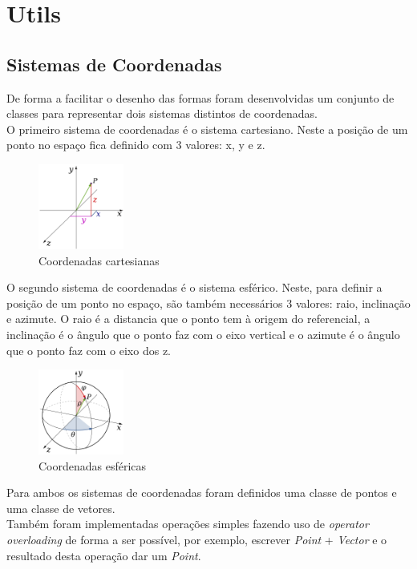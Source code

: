 \documentclass[a4paper]{report}
\begin{document}
\chapter{Utils}
\section{Sistemas de Coordenadas}
De forma a facilitar o desenho das formas foram desenvolvidas um conjunto de
classes para representar dois sistemas distintos de coordenadas.\\
O primeiro sistema de coordenadas é o sistema cartesiano. Neste a posição de um
ponto no espaço fica definido com 3 valores: x, y e z.\\
\begin{figure}[H]
    \centering 
    \includegraphics[width=0.25\textwidth]{images/Coord_XYZ.png}  
    \caption{Coordenadas cartesianas}
    \label{fig:coord_xyz}
\end{figure}
O segundo sistema de coordenadas é o sistema esférico. Neste, para definir a
posição de um ponto no espaço, são também necessários 3 valores: raio,
inclinação e azimute. O raio é a distancia que o ponto tem à origem do
referencial, a inclinação é o ângulo que o ponto faz com o eixo vertical e o
azimute é o ângulo que o ponto faz com o eixo dos z.
\begin{figure}[H]
    \centering 
    \includegraphics[width=0.25\textwidth]{images/Spherical_Coordinates.png}  
    \caption{Coordenadas esféricas}
    \label{fig:spherical_coordinates}
\end{figure}
Para ambos os sistemas de coordenadas foram definidos uma classe de pontos e uma
classe de vetores.\\
Também foram implementadas operações simples fazendo uso de \textit{operator
overloading} de forma a ser possível, por exemplo, escrever \textit{Point} +
\textit{Vector} e o resultado desta operação dar um \textit{Point}.
\end{document}
